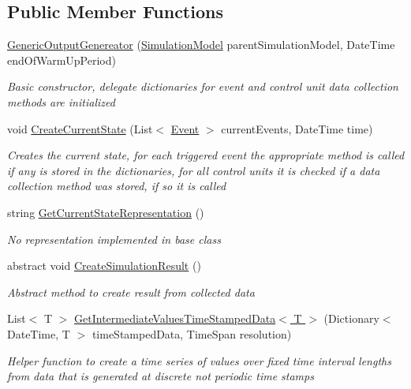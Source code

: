 \subsection*{Public Member Functions}
\begin{DoxyCompactItemize}
\item 
\hyperlink{class_simulation_core_1_1_model_log_1_1_generic_output_genereator_a0acd672c9c5d3fa2545e0a94a94b7566}{Generic\+Output\+Genereator} (\hyperlink{class_simulation_core_1_1_simulation_classes_1_1_simulation_model}{Simulation\+Model} parent\+Simulation\+Model, Date\+Time end\+Of\+Warm\+Up\+Period)
\begin{DoxyCompactList}\small\item\em Basic constructor, delegate dictionaries for event and control unit data collection methods are initialized \end{DoxyCompactList}\item 
void \hyperlink{class_simulation_core_1_1_model_log_1_1_generic_output_genereator_aa9eafb3ff202ec5ab13d02bd9cf3fe1b}{Create\+Current\+State} (List$<$ \hyperlink{class_simulation_core_1_1_h_c_c_m_elements_1_1_event}{Event} $>$ current\+Events, Date\+Time time)
\begin{DoxyCompactList}\small\item\em Creates the current state, for each triggered event the appropriate method is called if any is stored in the dictionaries, for all control units it is checked if a data collection method was stored, if so it is called \end{DoxyCompactList}\item 
string \hyperlink{class_simulation_core_1_1_model_log_1_1_generic_output_genereator_aebbfb494fb7c5ebadfc71cdf7e33e6fd}{Get\+Current\+State\+Representation} ()
\begin{DoxyCompactList}\small\item\em No representation implemented in base class \end{DoxyCompactList}\item 
abstract void \hyperlink{class_simulation_core_1_1_model_log_1_1_generic_output_genereator_a2a96adfea55b8aba75854cd02fc7636e}{Create\+Simulation\+Result} ()
\begin{DoxyCompactList}\small\item\em Abstract method to create result from collected data \end{DoxyCompactList}\item 
List$<$ T $>$ \hyperlink{class_simulation_core_1_1_model_log_1_1_generic_output_genereator_acb93b662759a4b834cab653910dc74ff}{Get\+Intermediate\+Values\+Time\+Stamped\+Data$<$ T $>$} (Dictionary$<$ Date\+Time, T $>$ time\+Stamped\+Data, Time\+Span resolution)
\begin{DoxyCompactList}\small\item\em Helper function to create a time series of values over fixed time interval lengths from data that is generated at discrete not periodic time stamps \end{DoxyCompactList}\end{DoxyCompactItemize}
